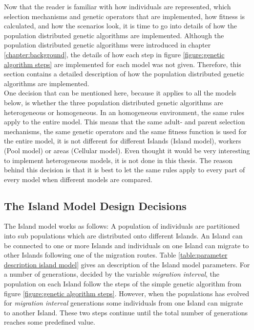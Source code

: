 Now that the reader is familiar with how individuals are represented, which selection mechanisms and genetic operators that are implemented, how fitness is calculated, and how the scenarios look, it is time to go into details of how the population distributed genetic algorithms are implemented. Although the population distributed genetic algorithms were introduced in chapter \ref{chapter:background}, the details of how each step in figure \ref{figure:genetic algorithm steps} are implemented for each model was not given. Therefore, this section contains a detailed description of how the population distributed genetic algorithms are implemented. \\


\noindent One decision that can be mentioned here, because it applies to all the models below, is whether the three population distributed genetic algorithms are heterogeneous or homogeneous. In an homogeneous environment, the same rules apply to the entire model. This means that the same adult- and parent selection mechanisms, the same genetic operators and the same fitness function is used for the entire model, it is not different for different Islands (Island model), workers (Pool model) or areas (Cellular model). Even thought it would be very interesting to implement heterogeneous models, it is not done in this thesis. The reason behind this decision is that it is best to let the same rules apply to every part of every model when different models are compared.\\


\subsection{The Island Model Design Decisions}


\noindent The Island model works as follows: A population of individuals are partitioned into sub populations which are distributed onto different Islands. An Island can be connected to one or more Islands and individuals on one Island can migrate to other Islands following one of the migration routes. Table \ref{table:parameter description island model} gives an description of the Island model parameters. For a number of generations, decided by the variable \textit{migration interval}, the population on each Island follow the steps of the simple genetic algorithm from figure \ref{figure:genetic algorithm steps}. However, when the populations has evolved for \textit{migration interval} generations some individuals from one Island can migrate to another Island. These two steps continue until the total number of generations reaches some predefined value.\\


